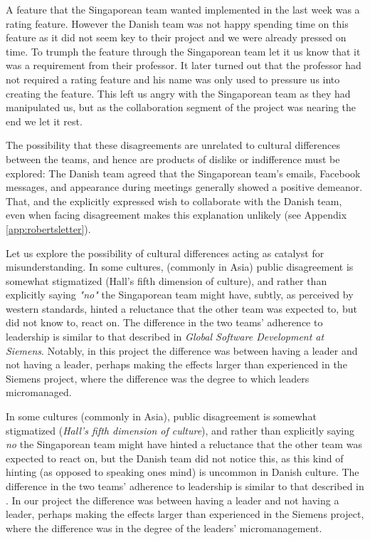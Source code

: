 A feature that the Singaporean team wanted implemented in the last week was
a rating feature. However the Danish team was not happy spending time on this
feature as it did not seem key to their project and we were already pressed on 
time. To trumph the feature through the Singaporean team let it us know
that it was a requirement from their professor. It later turned out that the
professor had not required a rating feature and his name was only used
to pressure us into creating the feature. This left us angry with the 
Singaporean team as they had manipulated us, but as the collaboration
segment of the project was nearing the end we let it rest.

The possibility that these disagreements are unrelated to cultural differences
between the teams, and hence are products of dislike or indifference must be
explored: The Danish team agreed that the Singaporean team's emails, Facebook
messages, and appearance during meetings generally showed a positive demeanor.
That, and the explicitly expressed wish to collaborate with the Danish team,
even when facing disagreement makes this explanation unlikely (see Appendix
\ref{app:robertsletter}).

Let us explore the possibility of cultural differences acting as catalyst for
misunderstanding. In some cultures, (commonly in Asia) public disagreement is
somewhat stigmatized (Hall's fifth dimension of
culture)\cite{surprises}\cite{herbsiemens}, and rather than explicitly saying
\emph{"no"} the Singaporean team might have, subtly, as perceived by western
standards, hinted a reluctance that the other team was expected to, but did not
know to, react on. The difference in the two teams' adherence to leadership is
similar to that described in \emph{Global Software Development at
Siemens}\cite{herbsiemens}. Notably, in this project the difference was between
having a leader and not having a leader, perhaps making the effects larger than
experienced in the Siemens project, where the difference was the degree to which
leaders micromanaged.

In some cultures (commonly in Asia), public disagreement is somewhat
stigmatized (\emph{Hall's fifth dimension of
culture})\cite{surprises}\cite{herbsiemens}, and rather than explicitly saying
\emph{no} the Singaporean team might have hinted a reluctance that the other
team was expected to react on, but the Danish team did not notice this, as this
kind of hinting (as opposed to speaking ones mind) is uncommon in Danish
culture. The difference in the two teams' adherence to leadership is similar to
that described in \cite{herbsiemens}. In our project the difference was between
having a leader and not having a leader, perhaps making the effects larger than
experienced in the Siemens project, where the difference was in the degree of
the leaders' micromanagement.


